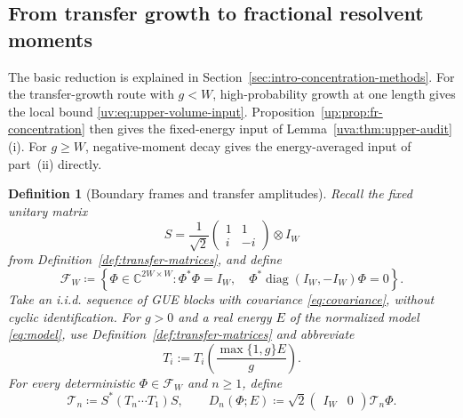 \documentclass[11pt]{article}
\numberwithin{equation}{section}
\newtheorem{definition}[theorem]{Definition}
\theoremstyle{remark}
\newcommand{\C}{\mathbb C}
\newcommand{\diag}{\operatorname{diag}}
\begin{document}
\subsection{From transfer growth to fractional resolvent moments}
\label{sec:upper-conversion}

The basic reduction is explained in Section~\ref{sec:intro-concentration-methods}.
For the transfer-growth route with $g<W$, high-probability growth at
one length gives the local bound \eqref{uv:eq:upper-volume-input}.
Proposition~\ref{up:prop:fr-concentration} then gives the
fixed-energy input of Lemma~\ref{uva:thm:upper-audit}\textup{(i)}.
For $g\ge W$, negative-moment decay gives the energy-averaged input
of part~\textup{(ii)} directly.

\begin{definition}[Boundary frames and transfer amplitudes]\label{def:boundary-frames}
Recall the fixed unitary matrix
\[
 S=\frac1{\sqrt2}\begin{pmatrix}1&1\\i&-i\end{pmatrix}\otimes I_W
\]
from Definition~\ref{def:transfer-matrices}, and define
\begin{equation}\label{up:eq:boundary-frame}
 \mathcal F_W\coloneqq
 \left\{\Phi\in\C^{2W\times W}:\Phi^*\Phi=I_W,\quad
                      \Phi^*\diag(I_W,-I_W)\Phi=0\right\}.
\end{equation}
Take an i.i.d. sequence of GUE blocks
with covariance \eqref{eq:covariance}, without cyclic identification.
For $g>0$ and a real energy $E$ of the normalized model
\eqref{eq:model}, use Definition~\ref{def:transfer-matrices} and abbreviate
\begin{equation}\label{eq:c-transfer}
 T_i:=T_i\!\left(\frac{\max\{1,g\}E}{g}\right).
\end{equation}
For every deterministic $\Phi\in\mathcal F_W$ and $n\ge1$, define
\begin{equation}\label{up:eq:D-definition}
 \mathcal T_n\coloneqq S^*(T_n\cdots T_1)S,\qquad
 D_n(\Phi;E)\coloneqq\sqrt2\begin{pmatrix}I_W&0\end{pmatrix}\mathcal T_n\Phi.
\end{equation}
\end{definition}
\end{document}
